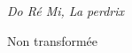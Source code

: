 \documentclass[preview]{standalone}
\begin{document}
\begin{center}
\em{Do Ré Mi, La perdrix}
    
Non transformée
\end{center}
\end{document}
